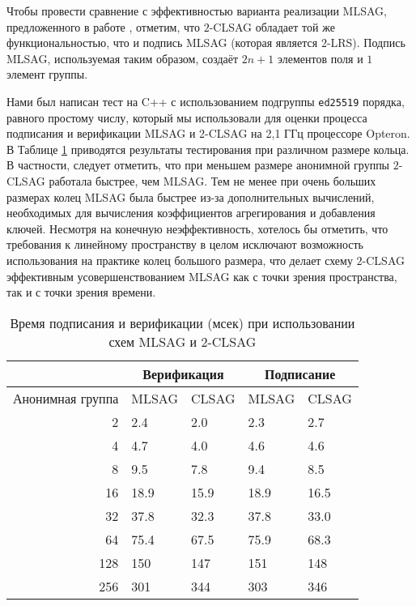 \documentclass{llncs}
\begin{document}
Чтобы провести сравнение с эффективностью варианта реализации \linebreak MLSAG, предложенного в работе \cite{noether2016ring}, отметим, что $2$-CLSAG  обладает той же функциональностью, что и  подпись MLSAG (которая является $2$-LRS). Подпись MLSAG, используемая таким образом, создаёт $2n+1$ элементов поля и $1$ элемент группы.

Нами был написан тест на C++ с использованием подгруппы \texttt{ed25519} порядка, равного простому числу, который мы использовали для оценки процесса подписания и верификации MLSAG и 2-CLSAG на 2,1 ГГц процессоре Opteron. В Таблице \ref{table:timing} приводятся результаты тестирования при различном размере кольца. В частности, следует отметить, что при меньшем размере анонимной группы $2$-CLSAG работала быстрее, чем MLSAG. Тем не менее при очень больших размерах колец MLSAG была быстрее из-за дополнительных вычислений, необходимых для вычисления коэффициентов агрегирования и добавления ключей. Несмотря на конечную неэффективность, хотелось бы отметить, что требования к линейному пространству в целом исключают возможность использования на практике колец большого размера, что делает схему $2$-CLSAG эффективным усовершенствованием MLSAG как с точки зрения пространства, так и с точки зрения времени.

\begin{table}[htp]
\begin{center}
\begin{tabular}{r|ll|ll}
& \multicolumn{2}{c|}{Верификация} & \multicolumn{2}{c}{Подписание} \\
\hline
Анонимная группа & MLSAG & CLSAG & MLSAG & CLSAG \\
\hline
2 & 2.4 & 2.0 & 2.3 & 2.7 \\
4 & 4.7 & 4.0 & 4.6 & 4.6 \\
8 & 9.5 & 7.8 & 9.4 & 8.5 \\
16 & 18.9 & 15.9 & 18.9 & 16.5 \\
32 & 37.8 & 32.3 & 37.8 & 33.0 \\
64 & 75.4 & 67.5 & 75.9 & 68.3 \\
128 & 150 & 147 & 151 & 148 \\
256 & 301 & 344 & 303 & 346
\end{tabular}
\end{center}
\caption{Время подписания и верификации (мсек) при использовании схем MLSAG и $2$-CLSAG}
\label{table:timing}
\end{table}



\end{document}
